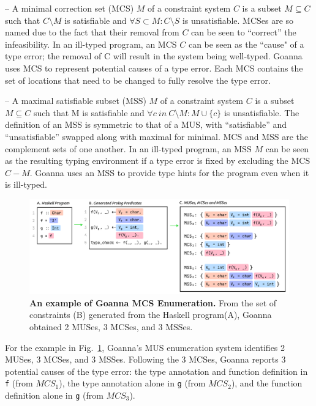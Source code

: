 \documentclass[pdflatex,sn-nature,Numbered]{sn-jnl}%
\begin{document}
    – A minimal correction set (MCS) $M$ of a constraint system $C$ is a subset $M \subseteq C$ such that $C \setminus M$ is satisfiable and $\forall{S} \subset M : C \setminus S$ is unsatisfiable. MCSes are so named due to the fact that their removal from $C$ can be seen to “correct” the infeasibility. In an ill-typed program, an MCS $C$ can be seen as the ``cause" of a type error; the removal of C will result in the system being well-typed. Goanna uses MCS to represent potential causes of a type error. Each MCS contains the set of locations that need to be changed to fully resolve the type error.

    – A maximal satisfiable subset (MSS) $M$ of a constraint system $C$ is a subset $M \subseteq C$ such that M is satisfiable and $\forall{c}\ in\ C \setminus M:M\cup\{c\}$ is unsatisfiable. The definition of an MSS is symmetric to that of a MUS, with “satisfiable” and “unsatisfiable” swapped along with maximal for minimal. MCS and MSS are the complement sets of one another. In an ill-typed program, an MSS $M$ can be seen as the resulting typing environment if a type error is fixed by excluding the MCS $C - M$. Goanna uses an MSS to provide type hints for the program even when it is ill-typed.
 
     \begin{figure}[ht!]
        \centering
        \includegraphics[width=\linewidth]{images/Enumeration-Example}
        \caption{\textbf{An example of Goanna MCS Enumeration.} From the set of constraints (B) generated from the Haskell program(A), Goanna obtained 2 MUSes, 3 MCSes, and 3 MSSes. }
        \label{fig:enumeration-example}
    \end{figure}
    
   For the example in Fig.~\ref{fig:enumeration-example}, Goanna's MUS enumeration system identifies 2 MUSes, 3 MCSes, and 3 MSSes. Following the 3 MCSes, Goanna reports 3 potential causes of the type error: the type annotation and function definition in \texttt{f} (from $MCS_1$), the type annotation alone in \texttt{g} (from $MCS_2$), and the function definition alone in \texttt{g} (from $MCS_3$). 
\end{document}
